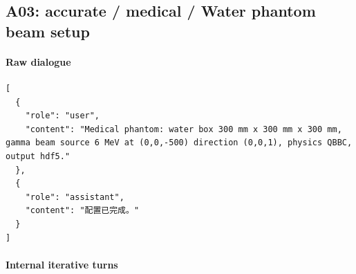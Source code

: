 \documentclass[11pt]{article}
\begin{document}
\subsection{A03: accurate / medical / Water phantom beam setup}
\paragraph{Raw dialogue}
\begin{lstlisting}
[
  {
    "role": "user",
    "content": "Medical phantom: water box 300 mm x 300 mm x 300 mm, gamma beam source 6 MeV at (0,0,-500) direction (0,0,1), physics QBBC, output hdf5."
  },
  {
    "role": "assistant",
    "content": "配置已完成。"
  }
]
\end{lstlisting}
\paragraph{Internal iterative turns}
\end{document}

